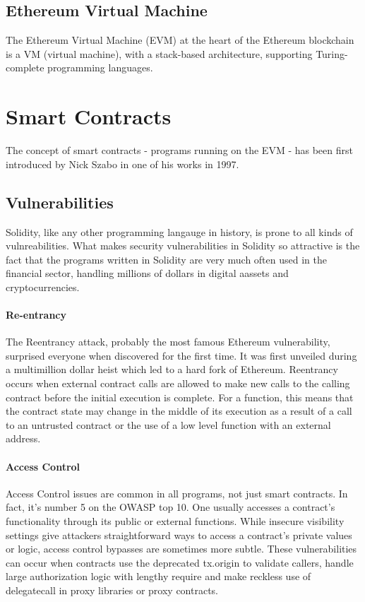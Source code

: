     \subsection{Ethereum Virtual Machine}
        
        The Ethereum Virtual Machine (EVM) at the heart of the Ethereum blockchain is a VM (virtual machine), with a stack-based architecture, supporting Turing-complete programming languages.
        

\section{Smart Contracts}
    The concept of smart contracts - programs running on the EVM - has been first introduced by Nick Szabo in one of his works in 1997.~\cite{szabo1997formalizing}

    \subsection{Vulnerabilities}
        Solidity, like any other programming langauge in history, is prone to all kinds of vulnreabilities.
        What makes security vulnerabilities in Solidity so attractive is the fact that the programs written in Solidity are very much often used in the financial sector,
        handling millions of dollars in digital aassets and cryptocurrencies.


            \paragraph{Re-entrancy}
            The Reentrancy attack, probably the most famous Ethereum vulnerability, surprised everyone when discovered for the first time. It was first unveiled during a multimillion dollar heist which led to a hard fork of Ethereum. Reentrancy occurs when external contract calls are allowed to make new calls to the calling contract before the initial execution is complete. For a function, this means that the contract state may change in the middle of its execution as a result of a call to an untrusted contract or the use of a low level function with an external address.   

            \paragraph{Access Control}
            Access Control issues are common in all programs, not just smart contracts. In fact, it's number 5 on the OWASP top 10. One usually accesses a contract's functionality through its public or external functions. While insecure visibility settings give attackers straightforward ways to access a contract's private values or logic, access control bypasses are sometimes more subtle. These vulnerabilities can occur when contracts use the deprecated tx.origin to validate callers, handle large authorization logic with lengthy require and make reckless use of delegatecall in proxy libraries or proxy contracts.   

